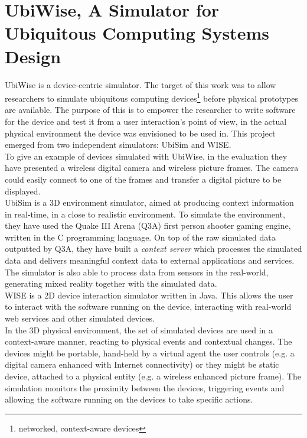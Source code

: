 \section{UbiWise, A Simulator for Ubiquitous Computing Systems Design}\label{sec:ubiwise}

UbiWise \cite{barton2003ubiwise} is a device-centric simulator. The target of this work was to allow researchers to simulate ubiquitous computing devices\footnote{networked, context-aware devices} before physical prototypes are available. The purpose of this is to empower the researcher to write software for the device and test it from a user interaction's point of view, in the actual physical environment the device was envisioned to be used in. This project emerged from two independent simulators: UbiSim and WISE.\\

To give an example of devices simulated with UbiWise, in the evaluation they have presented a wireless digital camera and wireless picture frames. The camera could easily connect to one of the frames and transfer a digital picture to be displayed.\\

UbiSim is a 3D environment simulator, aimed at producing context information in real-time, in a close to realistic environment. To simulate the environment, they have used the Quake III Arena (Q3A) \cite{q3a:online} first person shooter gaming engine, written in the C programming language. On top of the raw simulated data outputted by Q3A, they have built a \emph{context server} which processes the simulated data and delivers meaningful context data to external applications and services. The simulator is also able to process data from sensors in the real-world, generating mixed reality together with the simulated data.\\

WISE is a 2D device interaction simulator written in Java. This allows the user to interact with the software running on the device, interacting with real-world web services and other simulated devices.\\

In the 3D physical environment, the set of simulated devices are used in a context-aware manner, reacting to physical events and contextual changes. The devices might be portable, hand-held by a virtual agent the user controls (e.g. a digital camera enhanced with Internet connectivity) or they might be static device, attached to a physical entity (e.g. a wireless enhanced picture frame). The simulation monitors the proximity between the devices, triggering events and allowing the software running on the devices to take specific actions.\\

